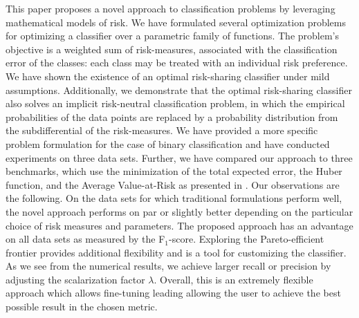 \documentclass[10pt,letterpaper]{article}
\newcommand{\1}{1{\hskip -2.55 pt}\hbox{I}}
\begin{document}
This paper proposes a novel approach to classification problems by leveraging mathematical models of risk.
We have formulated several optimization problems for optimizing a classifier over a parametric family of functions. 
The problem's objective is a weighted sum of risk-measures, associated with the classification error of the classes: each class may be treated with an individual risk preference. 
We have shown the existence of an optimal risk-sharing classifier under mild assumptions. 
Additionally, we demonstrate that the optimal risk-sharing classifier also solves an implicit risk-neutral classification problem, in which the empirical probabilities of the data points are replaced by a probability distribution from the subdifferential of the risk-measures.   
We have provided a more specific problem formulation for the case of binary classification and have conducted experiments on three data sets.
Further, we have compared our approach to three benchmarks, which use the minimization of the total expected error, the Huber function, and the Average Value-at-Risk as presented in \cite{gotoh2017support}.
Our observations are the following. On the data sets for which traditional formulations perform well, the novel approach performs on par or slightly better depending on the particular choice of risk measures and parameters.
The proposed approach has an advantage on all data sets as measured by the F$_1$-score.
Exploring the Pareto-efficient frontier provides additional flexibility and is a tool for customizing the classifier.
As we see from the numerical results, we achieve larger recall or precision by adjusting the scalarization factor $\lambda$.
Overall, this is an extremely flexible approach which allows fine-tuning leading allowing the user to achieve the best possible result in the chosen metric.


\end{document}
